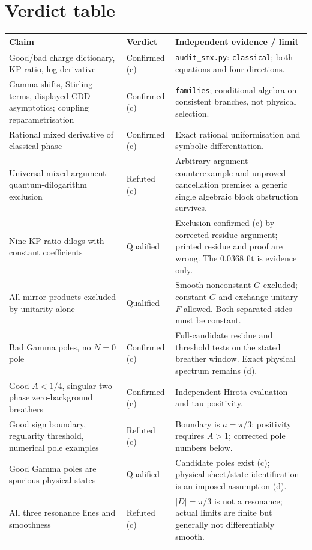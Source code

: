 \documentclass[11pt,a4paper]{article}
\newcommand{\scr}{\texttt{audit\_smx.py}}
\begin{document}
\section{Verdict table}
\small
\begin{longtable}{@{}L{5.0cm}L{2.1cm}L{8.0cm}@{}}
\toprule Claim & Verdict & Independent evidence / limit\\\midrule\endhead
Good/bad charge dictionary, KP ratio, log derivative & Confirmed (c) & \scr: \texttt{classical}; both equations and four directions.\\
Gamma shifts, Stirling terms, displayed CDD asymptotics; coupling reparametrisation & Confirmed (c) & \texttt{families}; conditional algebra on consistent branches, not physical selection.\\
Rational mixed derivative of classical phase & Confirmed (c) & Exact rational uniformisation and symbolic differentiation.\\
Universal mixed-argument quantum-dilogarithm exclusion & Refuted (c) & Arbitrary-argument counterexample and unproved cancellation premise; a generic single algebraic block obstruction survives.\\
Nine KP-ratio dilogs with constant coefficients & Qualified & Exclusion confirmed (c) by corrected residue argument; printed residue and proof are wrong. The 0.0368 fit is evidence only.\\
All mirror products excluded by unitarity alone & Qualified & Smooth nonconstant $G$ excluded; constant $G$ and exchange-unitary $F$ allowed. Both separated sides must be constant.\\
Bad Gamma poles, no $N=0$ pole & Confirmed (c) & Full-candidate residue and threshold tests on the stated breather window. Exact physical spectrum remains (d).\\
Good $A<1/4$, singular two-phase zero-background breathers & Confirmed (c) & Independent Hirota evaluation and tau positivity.\\
Good sign boundary, regularity threshold, numerical pole examples & Refuted (c) & Boundary is $a=\pi/3$; positivity requires $A>1$; corrected pole numbers below.\\
Good Gamma poles are spurious physical states & Qualified & Candidate poles exist (c); physical-sheet/state identification is an imposed assumption (d).\\
All three resonance lines and smoothness & Refuted (c) & $|D|=\pi/3$ is not a resonance; actual limits are finite but generally not differentiably smooth.\\

\end{longtable}
\end{document}
